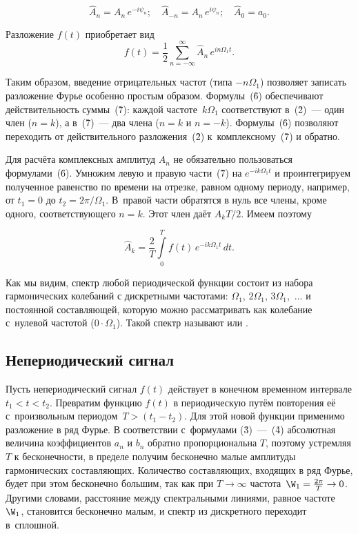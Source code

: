 \begin{equation}
	\hat{A}_n=A_n\, e^{-i\psi_n};\quad \hat{A}_{-n}=A_n\,e^{i\psi_n}; \quad \hat{A}_0=a_0.
\end{equation}

Разложение $f(t)$ приобретает вид
\begin{equation}
	f(t)=\frac{1}{2}\sum_{n=-\infty}^{\infty} \hat A_n\,e^{in\Omega_1t}.
\end{equation}

Таким образом, введение отрицательных частот (типа $-n\Omega_1$) позволяет записать разложение Фурье особенно простым
образом. Формулы~(\r6) обеспечивают действительность суммы~(\r7): каждой частоте~$k\Omega_1$ соответствуют в~(\r2)~--- один член ($n=k$), а в~(\r7)~--- два члена ($n=k$ и $n=-k$). Формулы~(\r6) позволяют переходить от действительного разложения~(\r2) к~комплексному~(\r7) и обратно.

Для расчёта комплексных амплитуд $A_n$ не обязательно пользоваться формулами~(\r6). Умножим левую и правую части~(\r7) на $e^{-ik\Omega_1 t}$ и проинтегрируем полученное равенство по времени на отрезке, равном одному периоду, например, от $t_1=0$ до $t_2=2\pi/\Omega_1$. В~правой части обратятся в нуль все члены, кроме одного, соответствующего $n=k$. Этот член даёт $A_k T/2$. Имеем поэтому

\begin{equation}
	\hat{A}_k=\frac{2}{T}\int\limits_{0}^{T}\!f(t)\, e^{-ik\Omega_1 t}\,dt.
\end{equation}

Как мы видим, спектр любой периодической функции состоит из набора гармонических колебаний с дискретными частотами:
$\Omega_1$, $2\Omega_1$, $3\Omega_1$,~$\dots$ и постоянной составляющей, которую можно рассматривать как колебание
с~нулевой частотой ($0\cdot \Omega_1$). Такой спектр называют  или .

\subsection{Непериодический сигнал}

Пусть непериодический сигнал $f(t)$ действует в конечном временном интервале $t_1<t<t_2$. Превратим  функцию $f(t)$ в периодическую путём повторения её с~произвольным периодом~$T>(t_1-t_2)$. Для этой новой функции применимо разложение в ряд Фурье. В соответствии с~формулами (\r3)~---~(\r4) абсолютная величина коэффициентов $a_n$ и $b_n$ обратно пропорциональна $T$, поэтому устремляя $T$ к бесконечности, в пределе получим бесконечно малые амплитуды гармонических составляющих. Количество составляющих, входящих в ряд Фурье, будет при этом бесконечно большим, так как при $T\to\infty$ частота~$\W_1=\frac{2\pi}{T}\to 0$. Другими словами, расстояние между спектральными линиями, равное частоте~$\W_1$, становится бесконечно малым, и спектр из дискретного переходит в~сплошной.

